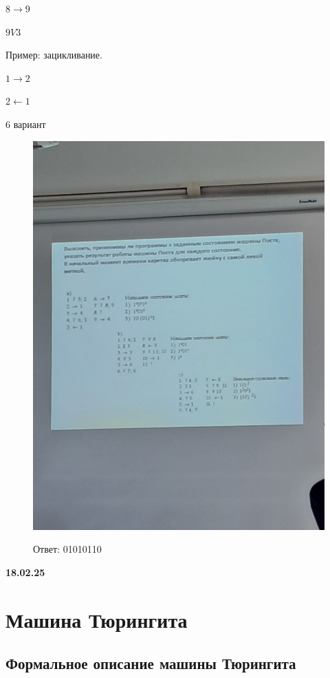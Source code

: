 \documentclass{article}
\begin{document}
$8 \rightarrow 9$

$9 V 3$

Пример: зацикливание. 

$1 → 2$

$2 ← 1$


6 вариант 
\begin{figure}
    \centering
    \includegraphics[width=1\linewidth]{photo_5285451810783490009_y.jpg}

Ответ: 01010110
    
\end{figure}

\vspace{10mm}

\textbf{18.02.25}

\section{Машина Тюрингита}

\subsection{Формальное описание машины Тюрингита}
\end{document}
